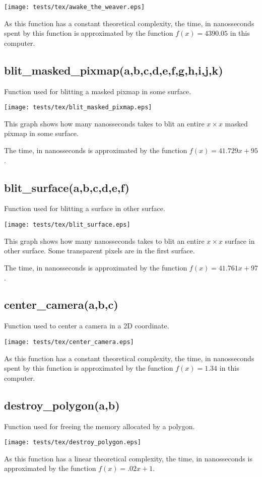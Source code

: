 \documentclass{article}
\begin{document}
\texttt{[image: tests/tex/awake\_the\_weaver.eps]}

As this function has a constant theoretical
complexity, the time, in nanosseconds spent 
by this function is 
approximated by the function $f(x)=4390.05$
in this computer.
\subsection{blit\_masked\_pixmap(a,b,c,d,e,f,g,h,i,j,k)}
Function used for blitting a masked pixmap in some surface.

\texttt{[image: tests/tex/blit\_masked\_pixmap.eps]}

This graph shows how many nanosseconds takes to blit an entire $x \times x$ masked pixmap in some surface.

The time, in nanosseconds is 
approximated by the function $f(x)=41.729x+95$.
\subsection{blit\_surface(a,b,c,d,e,f)}
Function used for blitting a surface in other surface.

\texttt{[image: tests/tex/blit\_surface.eps]}

This graph shows how many nanosseconds takes to blit an entire $x \times x$ surface in other surface. Some transparent pixels are in the first surface.

The time, in nanosseconds is 
approximated by the function $f(x)=41.761x+97$.
\subsection{center\_camera(a,b,c)}
Function used to center a camera in a 2D 
coordinate. 

\texttt{[image: tests/tex/center\_camera.eps]}

As this function has a constant
theoretical complexity, the time, in nanosseconds
spent by this function is 
approximated by the function $f(x)=1.34$
in this computer.
\subsection{destroy\_polygon(a,b)}
Function used for freeing the memory allocated by a polygon.

\texttt{[image: tests/tex/destroy\_polygon.eps]}

As this function has a linear theoretical
complexity, the time, in nanosseconds is 
approximated by the function $f(x)=.02x+1$.
\end{document}
